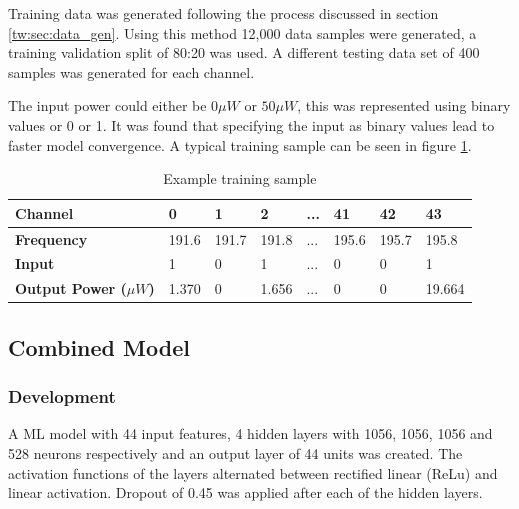 

Training data was generated following the process discussed in section \ref{tw:sec:data_gen}. Using this method 12,000 data samples were generated, a training validation split of 80:20 was used. A different testing data set of 400 samples was generated for each channel. 

The input power could either be $0\mu W$ or $50 \mu W$, this was represented using binary values or 0 or 1. It was found that specifying the input as binary values lead to faster model convergence.
A typical training sample can be seen in figure \ref{tab:ex_data_sample}.


\renewcommand{\arraystretch}{1.15}
\begin{table}[!h] 
    \centering
    \caption{Example training sample}
    \begin{tabular}{l l l l l l l l }
        \textbf{Channel} & 0 & 1 & 2 & ... & 41 & 42 & 43 \\
        \hline
        \textbf{Frequency} & 191.6 & 191.7 & 191.8 & ... & 195.6 & 195.7 & 195.8 \\
        \hline
        \textbf{Input} & 1 & 0 & 1 & ... & 0 & 0 &	1 \\
        \hline
        \textbf{Output Power ($\mu W$)} & 1.370 & 0 & 1.656 & ... & 0 &	0 &	19.664 \\
        \hline
    \end{tabular}
    \label{tab:ex_data_sample}
\end{table}

\FloatBarrier
\subsection{Combined Model}


\subsubsection{Development}


A ML model with 44 input features, 4 hidden layers with 1056, 1056, 1056 and 528 neurons respectively and an output layer of 44 units was created. The activation functions of the layers alternated between rectified linear (ReLu) and linear activation.  Dropout of 0.45 was applied after each of the hidden layers.


